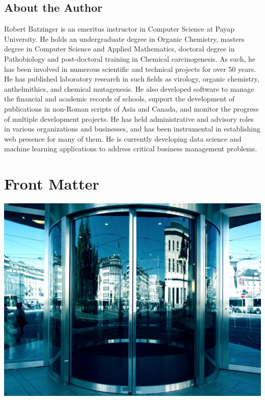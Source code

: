 \documentclass[]{book}
\begin{document}
\hypertarget{about-the-author}{%
\section*{About the Author}\label{about-the-author}}

Robert Batzinger is an emeritus instructor in Computer Science at Payap University. He holds an undergraduate degree in Organic Chemistry, masters degree in Computer Science and Applied Mathematics, doctoral degree in Pathobiology and post-doctoral training in Chemical carcinogenesis. As such, he has been involved in numerous scientific and technical projects for over 50 years. He has published laboratory research in such fields as virology, organic chemistry, anthelmithics, and chemical mutagenesis. He also developed software to manage the financial and academic records of schools, support the development of publications in non-Roman scripts of Asia and Canada, and monitor the progress of multiple development projects. He has held administrative and advisory roles in various organizations and businesses, and has been instrumental in establishing web presence for many of them. He is currently developing data science and machine learning applications to address critical business management problems.

\hypertarget{front-matter}{%
\chapter*{Front Matter}\label{front-matter}}

\includegraphics[width=0.9\linewidth]{images/door}
\end{document}
